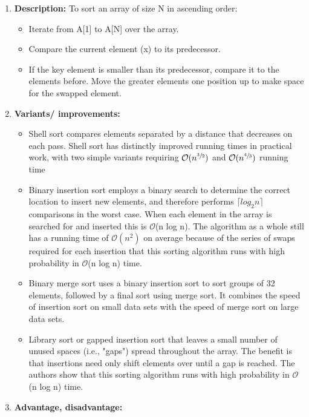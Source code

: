\documentclass[11pt,a4paper]{article}
\begin{document}
{\begin{enumerate}[label=\textbf{\arabic*})]
				\item \textbf{Description:}
					To sort an array of size N in ascending order: 
						\begin{itemize}
							\item Iterate from A[1] to A[N] over the array. 
							\item Compare the current element (x) to its predecessor. 
							\item If the key element is smaller than its predecessor, compare it to the elements before. Move the greater elements one position up to make space for the swapped element.
						\end{itemize}
				\item \textbf{Variants/ improvements:}
					\begin{itemize}
						\item Shell sort compares elements separated by a distance that decreases on each pass. Shell sort has distinctly improved running times in practical work, with two simple variants requiring $\mathcal{O}(n^{\sfrac{3}{2}})$ and $\mathcal{O}(n^{\sfrac{4}{3}})$ running time
						\item Binary insertion sort employs a binary search to determine the correct location to insert new elements, and therefore performs $\lceil log_{2}n \rceil$ comparisons in the worst case. When each element in the array is searched for and inserted this is $\mathcal{O}$(n log n). The algorithm as a whole still has a running time of $\mathcal{O}(n^2)$ on average because of the series of swaps required for each insertion
						that this sorting algorithm runs with high probability in $\mathcal{O}$(n log n) time.
						\item Binary merge sort uses a binary insertion sort to sort groups of 32 elements, followed by a final sort using merge sort. It combines the speed of insertion sort on small data sets with the speed of merge sort on large data sets.
						\item Library sort or gapped insertion sort that leaves a small number of unused spaces (i.e., "gaps") spread throughout the array. The benefit is that insertions need only shift elements over until a gap is reached. The authors show that this sorting algorithm runs with high probability in $\mathcal{O}$(n log n) time.
					\end{itemize}
				\item \textbf{Advantage, disadvantage:}
					\begin{table}[H]
						\centering
						\begin{tabular}{|p{8cm}|p{8cm}|}

\end{tabular}
\end{table}
\end{enumerate}}
\end{document}
